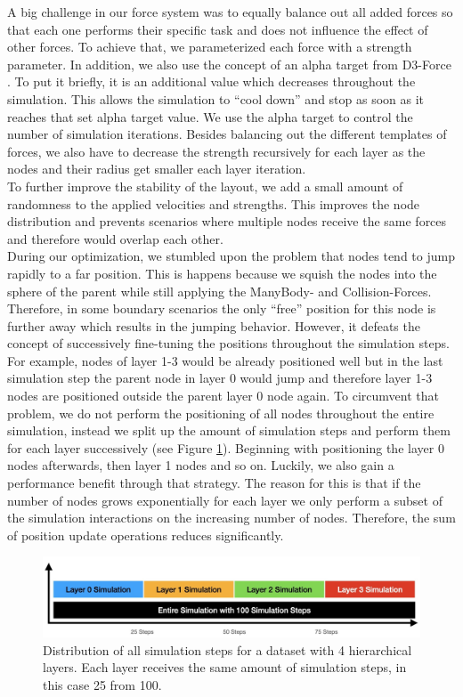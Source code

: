 A big challenge in our force system was to equally balance out all added forces so that each one performs their specific task and does not influence the effect of other forces. To achieve that, we parameterized each force with a strength parameter.
In addition, we also use the concept of an alpha target from D3-Force \cite{bostock_d3forcejs_nodate}. To put it briefly, it is an additional value which decreases throughout the simulation. This allows the simulation to “cool down” and stop as soon as it reaches that set alpha target value. We use the alpha target to control the number of simulation iterations. 
Besides balancing out the different templates of forces, we also have to decrease the strength recursively for each layer as the nodes and their radius get smaller each layer iteration.\\
To further improve the stability of the layout, we add a small amount of randomness to the applied velocities and strengths. This improves the node distribution and prevents scenarios where multiple nodes receive the same forces and therefore would overlap each other.\\
During our optimization, we stumbled upon the problem that nodes tend to jump rapidly to a far position. This is happens because we squish the nodes into the sphere of the parent while still applying the ManyBody- and Collision-Forces. Therefore, in some boundary scenarios the only “free” position for this node is further away which results in the jumping behavior. However, it defeats the concept of successively fine-tuning the positions throughout the simulation steps. For example, nodes of layer 1-3 would be already positioned well but in the last simulation step the parent node in layer 0 would jump and therefore layer 1-3 nodes are positioned outside the parent layer 0 node again. To circumvent that problem, we do not perform the positioning of all nodes throughout the entire simulation, instead we split up the amount of simulation steps and perform them for each layer successively (see Figure \ref{fig:SimulationSteps}). Beginning with positioning the layer 0 nodes afterwards, then layer 1 nodes and so on. Luckily, we also gain a performance benefit through that strategy. The reason for this is that if the number of nodes grows exponentially for each layer we only perform a subset of the simulation interactions on the increasing number of nodes. Therefore, the sum of position update operations reduces significantly.
\begin{figure}[h]
    \centering
    \includegraphics[width=\textwidth]{graphics/simulationStepsSplit.jpg}
    \caption[Distribution of all simulation steps.]{Distribution of all simulation steps for a dataset with 4 hierarchical layers. Each layer receives the same amount of simulation steps, in this case 25 from 100.} %
    \label{fig:SimulationSteps} 
  \end{figure}
